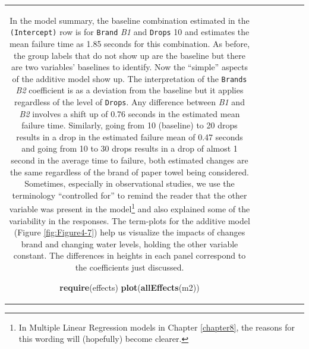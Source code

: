 \documentclass[]{book}
\newenvironment{Shaded}{\begin{snugshade}}{\end{snugshade}}
\newcommand{\KeywordTok}[1]{\textcolor[rgb]{0.13,0.29,0.53}{\textbf{#1}}}
\newcommand{\NormalTok}[1]{#1}
\let\rmarkdownfootnote\footnote%
\def\footnote{\protect\rmarkdownfootnote}
\theoremstyle{definition}
\theoremstyle{definition}
\theoremstyle{remark}
\begin{document}
\begin{longtable}[]{@{}ccccccc@{}}
\begin{minipage}[b]{0.10\columnwidth}
\begin{Shaded}
\begin{Highlighting}[]
\begin{Shaded}
\begin{Highlighting}[]
In the model summary, the baseline combination estimated in the
\texttt{(Intercept)} row is for \texttt{Brand} \emph{B1} and
\texttt{Drops} 10 and estimates the mean failure time as 1.85 seconds
for this combination. As before, the group labels that do not show up
are the baseline but there are two variables' baselines to identify. Now
the ``simple'' aspects of the additive model show up. The interpretation
of the \texttt{Brands} \emph{B2} coefficient is as a deviation from the
baseline but it applies regardless of the level of \texttt{Drops}. Any
difference between \emph{B1} and \emph{B2} involves a shift up of 0.76
seconds in the estimated mean failure time. Similarly, going from 10
(baseline) to 20 drops results in a drop in the estimated failure mean
of 0.47 seconds and going from 10 to 30 drops results in a drop of
almost 1 second in the average time to failure, both estimated changes
are the same regardless of the brand of paper towel being considered.
Sometimes, especially in observational studies, we use the terminology
``controlled for'' to remind the reader that the other variable was
present in the model\footnote{In Multiple Linear Regression models in
  Chapter \ref{chapter8}, the reasons for this wording will (hopefully)
  become clearer.} and also explained some of the variability in the
responses. The term-plots for the additive model (Figure
\ref{fig:Figure4-7}) help us visualize the impacts of changes brand and
changing water levels, holding the other variable constant. The
differences in heights in each panel correspond to the coefficients just
discussed.





\begin{Shaded}
\begin{Highlighting}[]
\KeywordTok{require}\NormalTok{(effects)}
\KeywordTok{plot}\NormalTok{(}\KeywordTok{allEffects}\NormalTok{(m2))}
\end{Highlighting}
\end{Shaded}


\end{Highlighting}
\end{Shaded}
\end{Highlighting}
\end{Shaded}
\end{minipage}
\end{longtable}
\end{document}

